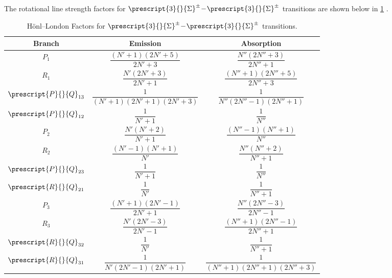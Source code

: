 \documentclass[11pt, twoside, fleqn]{report}
\newcommand{\dash}{\!-\!}
\newcommand{\state}[2]{\prescript{#1}{}{#2}}
\begin{document}
The rotational line strength factors for $\state{3}{\Sigma}^{\pm}\dash\state{3}{\Sigma}^{\pm}$ transitions are shown below in \cref{t:honl_london_factors_3s} \cite{tatumHonlLondonFactors1966}.
\begin{table}[H]
    \centering
    \caption{H\"onl--London Factors for $\state{3}{\Sigma}^{\pm}\dash\state{3}{\Sigma}^{\pm}$ transitions.}
    \label{t:honl_london_factors_3s}
    \begin{tabular}{ccc}
        \toprule
        Branch              & Emission                                & Absorption                                 \\
        \midrule
        $P_1$             & $\dfrac{(N' + 1)(2N' + 5)}{2N' + 3}$    & $\dfrac{N''(2N'' + 3)}{2N'' + 1}$          \\
        \addlinespace[0.5em]
        $R_1$             & $\dfrac{N'(2N' + 3)}{2N' + 1}$          & $\dfrac{(N'' + 1)(2N'' + 5)}{2N'' + 3}$    \\
        \addlinespace[0.5em]
        $\state{P}{Q}_{13}$ & $\dfrac{1}{(N' + 1)(2N' + 1)(2N' + 3)}$ & $\dfrac{1}{N''(2N'' - 1)(2N'' + 1)}$       \\
        \addlinespace[0.5em]
        $\state{P}{Q}_{12}$ & $\dfrac{1}{N' + 1}$                     & $\dfrac{1}{N''}$                           \\
        \addlinespace[0.5em]
        $P_2$             & $\dfrac{N'(N' + 2)}{N' + 1}$            & $\dfrac{(N'' - 1)(N'' + 1)}{N''}$          \\
        \addlinespace[0.5em]
        $R_2$             & $\dfrac{(N' - 1)(N' + 1)}{N'}$          & $\dfrac{N''(N'' + 2)}{N'' + 1}$            \\
        \addlinespace[0.5em]
        $\state{P}{Q}_{23}$ & $\dfrac{1}{N' + 1}$                     & $\dfrac{1}{N''}$                           \\
        \addlinespace[0.5em]
        $\state{R}{Q}_{21}$ & $\dfrac{1}{N'}$                         & $\dfrac{1}{N'' + 1}$                       \\
        \addlinespace[0.5em]
        $P_3$             & $\dfrac{(N' + 1)(2N' - 1)}{2N' + 1}$    & $\dfrac{N''(2N'' - 3)}{2N'' - 1}$          \\
        \addlinespace[0.5em]
        $R_3$             & $\dfrac{N'(2N' - 3)}{2N' - 1}$          & $\dfrac{(N'' + 1)(2N'' - 1)}{2N'' + 1}$    \\
        \addlinespace[0.5em]
        $\state{R}{Q}_{32}$ & $\dfrac{1}{N'}$                         & $\dfrac{1}{N'' + 1}$                       \\
        \addlinespace[0.5em]
        $\state{R}{Q}_{31}$ & $\dfrac{1}{N'(2N' - 1)(2N' + 1)}$       & $\dfrac{1}{(N'' + 1)(2N'' + 1)(2N'' + 3)}$ \\
        \bottomrule
    \end{tabular}
\end{table}
\end{document}
